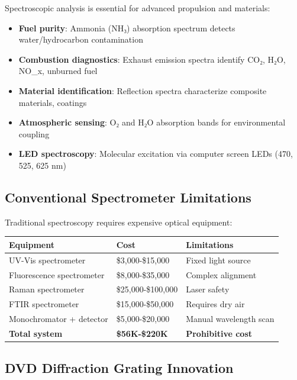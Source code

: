 \documentclass[12pt,a4paper]{article}
\begin{document}
Spectroscopic analysis is essential for advanced propulsion and materials:

\begin{itemize}
\item \textbf{Fuel purity}: Ammonia (NH₃) absorption spectrum detects water/hydrocarbon contamination
\item \textbf{Combustion diagnostics}: Exhaust emission spectra identify CO₂, H₂O, NO_x, unburned fuel
\item \textbf{Material identification}: Reflection spectra characterize composite materials, coatings
\item \textbf{Atmospheric sensing}: O₂ and H₂O absorption bands for environmental coupling
\item \textbf{LED spectroscopy}: Molecular excitation via computer screen LEDs (470, 525, 625 nm)
\end{itemize}

\subsection{Conventional Spectrometer Limitations}

Traditional spectroscopy requires expensive optical equipment:

\begin{center}
\begin{tabular}{|l|l|l|}
\hline
\textbf{Equipment} & \textbf{Cost} & \textbf{Limitations} \\
\hline
UV-Vis spectrometer & \$3,000-\$15,000 & Fixed light source \\
Fluorescence spectrometer & \$8,000-\$35,000 & Complex alignment \\
Raman spectrometer & \$25,000-\$100,000 & Laser safety \\
FTIR spectrometer & \$15,000-\$50,000 & Requires dry air \\
Monochromator + detector & \$5,000-\$20,000 & Manual wavelength scan \\
\hline
\textbf{Total system} & \textbf{\$56K-\$220K} & \textbf{Prohibitive cost} \\
\hline
\end{tabular}
\end{center}

\subsection{DVD Diffraction Grating Innovation}
\end{document}
